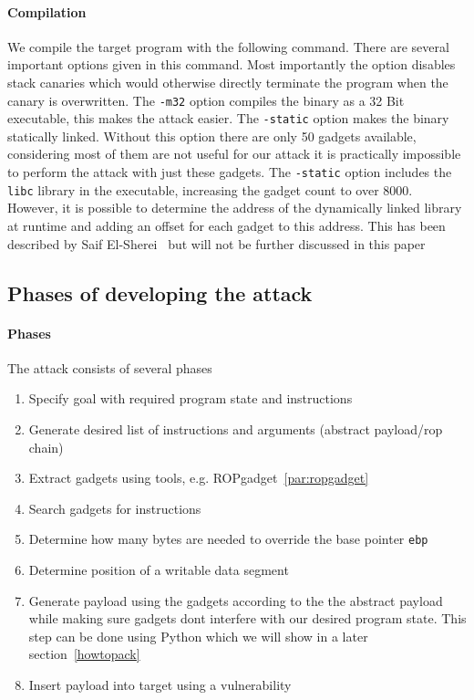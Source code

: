 \documentclass[journal=tosc,submission, notanonymous]{iacrtrans}
\begin{document}
\paragraph{Compilation}
We compile the target program with the following command. There are several important options given in this command. Most importantly the  option disables stack canaries which would otherwise directly terminate the program when the canary is overwritten. The \Verb+-m32+ option compiles the binary as a 32 Bit executable, this makes the attack easier. The \Verb+-static+ option makes the binary statically linked. Without this option there are only 50 gadgets available, considering most of them are not useful for our attack it is practically impossible to perform the attack with just these gadgets. The \Verb+-static+ option includes the \Verb+libc+ library in the executable, increasing the gadget count to over 8000. However, it is possible to determine the address of the dynamically linked library at runtime and adding an offset for each gadget to this address. This has been described by Saif El-Sherei~\cite{el-sherei} but will not be further discussed in this paper
\subsection{Phases of developing the attack}
\paragraph{Phases}
The attack consists of several phases
\begin{enumerate}
  \item Specify goal with required program state and instructions
  \item Generate desired list of instructions and arguments (abstract payload/rop chain)
  \item Extract gadgets using tools, e.g. ROPgadget~\cref{par:ropgadget}
  \item Search gadgets for instructions
  \item Determine how many bytes are needed to override the base pointer \Verb+ebp+
  \item Determine position of a writable data segment
  \item Generate payload using the gadgets according to the the abstract payload while making sure gadgets dont interfere with our desired program state. This step can be done using Python which we will show in a later section~\cref{howtopack}
  \item Insert payload into target using a vulnerability
\end{enumerate}
\end{document}
